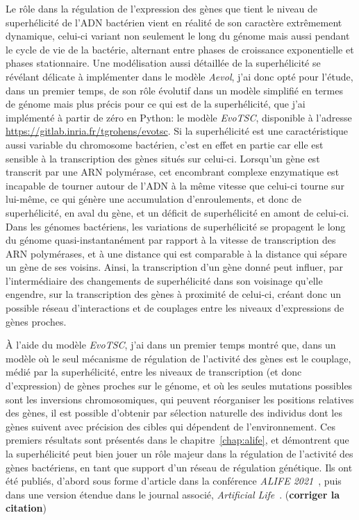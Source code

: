 Le rôle dans la régulation de l'expression des gènes que tient le niveau de superhélicité de l'ADN bactérien vient en réalité de son caractère extrêmement dynamique, celui-ci variant non seulement le long du génome mais aussi pendant le cycle de vie de la bactérie, alternant entre phases de croissance exponentielle et phases stationnaire.
Une modélisation aussi détaillée de la superhélicité se révélant délicate à implémenter dans le modèle \emph{Aevol}, j'ai donc opté pour l'étude, dans un premier temps, de son rôle évolutif dans un modèle simplifié en termes de génome mais plus précis pour ce qui est de la superhélicité, que j'ai implémenté à partir de zéro en Python: le modèle \emph{EvoTSC}, disponible à l'adresse \url{https://gitlab.inria.fr/tgrohens/evotsc}.
Si la superhélicité est une caractéristique aussi variable du chromosome bactérien, c'est en effet en partie car elle est sensible à la transcription des gènes situés sur celui-ci.
Lorsqu'un gène est transcrit par une ARN polymérase, cet encombrant complexe enzymatique est incapable de tourner autour de l'ADN à la même vitesse que celui-ci tourne sur lui-même, ce qui génère une accumulation d'enroulements, et donc de superhélicité, en aval du gène, et un déficit de superhélicité en amont de celui-ci.
Dans les génomes bactériens, les variations de superhélicité se propagent le long du génome quasi-instantanément par rapport à la vitesse de transcription des ARN polymérases, et à une distance qui est comparable à la distance qui sépare un gène de ses voisins.
Ainsi, la transcription d'un gène donné peut influer, par l'intermédiaire des changements de superhélicité dans son voisinage qu'elle engendre, sur la transcription des gènes à proximité de celui-ci, créant donc un possible réseau d'interactions et de couplages entre les niveaux d'expressions de gènes proches.

À l'aide du modèle \emph{EvoTSC}, j'ai dans un premier temps montré que, dans un modèle où le seul mécanisme de régulation de l'activité des gènes est le couplage, médié par la superhélicité, entre les niveaux de transcription (et donc d'expression) de gènes proches sur le génome, et où les seules mutations possibles sont les inversions chromosomiques, qui peuvent réorganiser les positions relatives des gènes, il est possible d'obtenir par sélection naturelle des individus dont les gènes suivent avec précision des cibles qui dépendent de l'environnement.
Ces premiers résultats sont présentés dans le chapitre~\ref{chap:alife}, et démontrent que la superhélicité peut bien jouer un rôle majeur dans la régulation de l'activité des gènes bactériens, en tant que support d'un réseau de régulation génétique.
Ils ont été publiés, d'abord sous forme d'article dans la conférence \emph{ALIFE 2021}~\citep{grohens2021}, puis dans une version étendue dans le journal associé, \emph{Artificial Life}~\citep{grohens2021}. (\textbf{corriger la citation})

